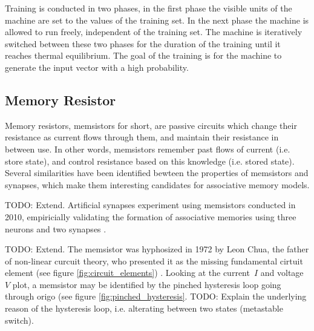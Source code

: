 \documentclass[12pt, a4paper]{article}
\begin{document}

Training is conducted in two phases, in the first phase the visible units of the machine are set to the values of the training set. In the next phase the machine is allowed to run freely, independent of the training set. The machine is iteratively switched between these two phases for the duration of the training until it reaches thermal equilibrium. The goal of the training is for the machine to generate the input vector with a high probability.


\subsection{Memory Resistor}


Memory resistors, memsistors for short, are passive circuits which change their resistance as current flows through them, and maintain their resistance in between use. In other words, memsistors remember past flows of current (i.e. store state), and control resistance based on this knowledge (i.e. stored state). Several similarities have been identified bewteen the properties of memsistors and synapses, which make them interesting candidates for associative memory models.

TODO: Extend. Artificial synapses experiment using memsistors conducted in 2010, empiricially validating the formation of associative memories using three neurons and two synapses \cite{memristor_conditioning}.

TODO: Extend. The memsistor was hyphosized in 1972 by Leon Chua, the father of non-linear curcuit theory, who presented it as the missing fundamental cirtuit element (see figure \ref{fig:circuit_elements}) \cite{chua_memristor}. Looking at the current~$I$ and voltage~$V$ plot, a memsistor may be identified by the pinched hysteresis loop going through origo (see figure \ref{fig:pinched_hysteresis}. TODO: Explain the underlying reason of the hysteresis loop, i.e. alterating between two states (metastable switch).
\end{document}
